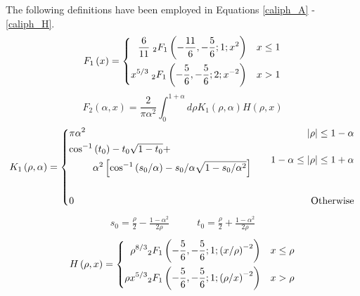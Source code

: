 The following definitions have been employed in Equations \ref{caliph_A} - \ref{caliph_H}.
\begin{equation}\label{F_1_eqn}
F_{1}\left(x\right) = 
\left\{
\begin{aligned}
\frac{6}{11}\; \vphantom{F}_{2}F_{1}\left(-\frac{11}{6}, -\frac{5}{6};1; x^{2}\right) & \quad x\le 1 \\
x^{5/3}\; \vphantom{F}_{2}F_{1}\left(-\frac{5}{6}, -\frac{5}{6};2; x^{-2}\right)        & \quad x>1
\end{aligned}
\right.
\end{equation}
\begin{equation}\label{F_2_eqn}
F_{2}\left(\alpha, x\right) = \frac{2}{\pi \alpha^{2}} \int_{0}^{1+\alpha} d\rho K_{1}\left(\rho, \alpha\right)H\left(\rho, x\right)
\end{equation}
\begin{equation}\label{K_1_eqn}
K_{1}\left(\rho,\alpha\right) = 
\left\{
\begin{aligned}
&
\pi \alpha^{2} & \left\vert\rho\right\vert \le 1-\alpha \\
&
\begin{split}
\cos^{-1}&\left(t_{0}\right) - t_{0}\sqrt{1-t_{0}} + \\
&\alpha^{2}\left[\cos^{-1}\left(s_{0}/\alpha\right) - s_{0}/\alpha\sqrt{1-s_{0}/\alpha^{2}}\right] 
\end{split}
& \quad 1 - \alpha \le \left\vert\rho\right\vert  \le 1+\alpha \\
\\
& 0 & {\rm Otherwise}
\end{aligned}
\right.
\end{equation}
\begin{equation}\label{s0_t0_eqn}
\begin{aligned}
s_{0} = \frac{\rho}{2} - \frac{1 - \alpha^{2}}{2\rho} \quad & \quad t_{0} = \frac{\rho}{2} + \frac{1 - \alpha^{2}}{2\rho} 
\end{aligned}
\end{equation}
\begin{equation}\label{H_eqn}
H\left(\rho,x\right) = 
\left\{
\begin{aligned}
\rho^{8/3} \vphantom{F}_{2}F_{1}\left(-\frac{5}{6}, -\frac{5}{6};1; \left(x/\rho\right)^{-2}\right)        & \quad x\le \rho \\
\rho x^{5/3} \vphantom{F}_{2}F_{1}\left(-\frac{5}{6}, -\frac{5}{6};1; \left(\rho/x\right)^{-2}\right)        & \quad x > \rho
\end{aligned}
\right.
\end{equation}
